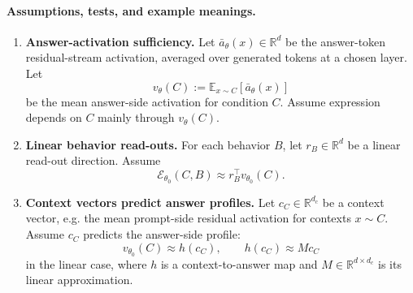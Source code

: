 \documentclass[11pt]{article}
\theoremstyle{definition}
\theoremstyle{definition}
\theoremstyle{assumptionstyle}
\newcounter{prediction}
\begin{document}
\paragraph{Assumptions, tests, and example meanings.}
\begin{enumerate}
\item[\textbf{A1.}] \textbf{Answer-activation sufficiency.}
Let \(\bar a_\theta(x)\in\mathbb R^d\) be the answer-token residual-stream
activation, averaged over generated tokens at a chosen layer. Let
\[
v_\theta(C):=\mathbb E_{x\sim C}[\bar a_\theta(x)]
\]
be the mean answer-side activation for condition \(C\). Assume expression depends
on \(C\) mainly through \(v_\theta(C)\).


\item[\textbf{A2.}] \textbf{Linear behavior read-outs.}
For each behavior \(B\), let \(r_B\in\mathbb R^d\) be a linear read-out direction.
Assume
\[
\mathcal E_{\theta_0}(C,B)\approx r_B^\top v_{\theta_0}(C).
\]


\item[\textbf{A3.}] \textbf{Context vectors predict answer profiles.}
Let \(c_C\in\mathbb R^{d_c}\) be a context vector, e.g. the mean prompt-side
residual activation for contexts \(x\sim C\). Assume \(c_C\) predicts the
answer-side profile:
\[
v_{\theta_0}(C)\approx h(c_C),
\qquad
h(c_C)\approx Mc_C
\]
in the linear case, where \(h\) is a context-to-answer map and
\(M\in\mathbb R^{d\times d_c}\) is its linear approximation.



\end{enumerate}
\end{document}
